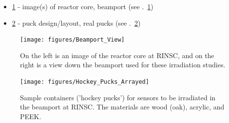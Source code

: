 \begin{itemize}
    \item \ref{fig:RINSC_Facility} - image(s) of reactor core, beamport (see .~\ref{fig:RINSC_Facility})
    \item \ref{fig:Pucks_Arrayed} - puck design/layout, real pucks (see .~\ref{fig:Pucks_Arrayed})
\end{itemize}

\begin{figure}[!hbt]
  \begin{center}
    \texttt{[image: figures/Beamport\_View]}
    \caption{On the left is an image of the reactor core at RINSC, and on the right is a view down the beamport used for these irradiation studies.}
    \label{fig:RINSC_Facility}
  \end{center}
\end{figure}

\begin{figure}[!hbt]
  \begin{center}
    \texttt{[image: figures/Hockey\_Pucks\_Arrayed]}
    \caption{Sample containers ('hockey pucks') for sensors to be irradiated in the beamport at RINSC. The materials are wood (oak), acrylic, and PEEK.}
    \label{fig:Pucks_Arrayed}
  \end{center}
\end{figure}

